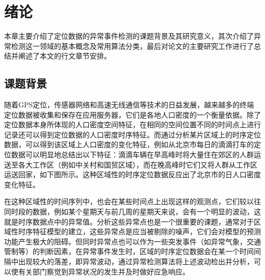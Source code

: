 \documentclass[a4paper,AutoFakeBold,oneside,12pt]{book}
\begin{document}
  
\newpage

  
\newpage

  
\newpage

 
\newpage

\frontmatter\tableofcontents %

\newpage\mainmatter
{} %
\pagestyle{fancy} %


\chapter{绪论}


本章主要介绍了定位数据的异常事件检测的课题背景及其研究意义，其次介绍了异常检测这一领域的基本概念及常用算法分类，最后对论文的主要研究工作进行了总结并阐述了本文的行文章节安排。

\section{课题背景}

随着GPS定位，传感器网络和高速无线通信等技术的日益发展，越来越多的终端定位数据被收集和保存在应用服务器，它们是各地人口密度的一个衡量依据。除了定位数据本身所体现的人口密度空间特征，在相同的空间位置不同的时间点上进行记录还可以得到定位数据的人口密度时序特征。而通过分析某片区域上的时序定位数据，可以得到该区域上人口密度的变化特征，例如从北京市每日的滴滴打车的定位数据可以明显地总结出以下特征：滴滴车辆在早高峰时将大量住在郊区的人群运送至各大工作区（例如中关村和国贸区域），而在晚高峰时它们又将人群从工作区运送回家，如下图所示。这种区域性的时序定位数据反应出了北京市的日人口密度变化特征。

	在这种区域性的时间序列中，也会在某些时间点上出现这样的观测点，它们较以往同时段的数据，例如某个星期天与前几周的星期天来说，会有一个明显的波动，这就是时序数据点中的异常值。分析这些异常点也是一个很重要的课题，通常对于区域性时序特征模型的建立，这些异常点是应当被剔除的噪声，它们会对模型的预测功能产生极大的阻碍。但同时异常点也可以作为一些突发事件（如异常气象，交通管制等）的判断因素，在异常事件发生时，区域的时序定位数据会在某一个时间间隔中出现较大的落差，即异常波动，通过异常检测算法将上述波动检出并分析，可以使有关部门察觉到异常状况的发生并及时做好应急响应。
\end{document}
